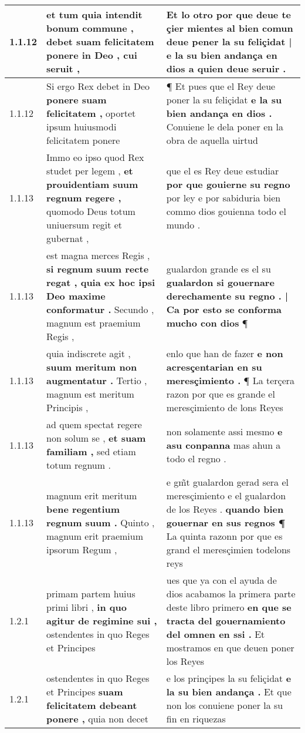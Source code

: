 \begin{tabular}{|p{1cm}|p{6.5cm}|p{6.5cm}|}
1.1.12 & et tum quia intendit bonum commune , \textbf{ debet suam felicitatem ponere in Deo , } cui seruit , & Et lo otro por que deue te çier mientes al bien comun \textbf{ deue pener la su feliçidat | e la su bien andança en dios } a quien deue seruir . \\\hline
1.1.12 & Si ergo Rex debet in Deo \textbf{ ponere suam felicitatem , } oportet ipsum huiusmodi felicitatem ponere & ¶ Et pues que el Rey deue poner la su feliçidat \textbf{ e la su bien andança en dios . } Conuiene le dela poner en la obra de aquella uirtud \\\hline
1.1.13 & Immo eo ipso quod Rex studet per legem , \textbf{ et prouidentiam suum regnum regere , } quomodo Deus totum uniuersum regit et gubernat , & que el es Rey deue estudiar \textbf{ por que gouierne su regno } por ley e por sabiduria bien commo dios gouienna todo el mundo . \\\hline
1.1.13 & est magna merces Regis , \textbf{ si regnum suum recte regat , quia ex hoc ipsi Deo maxime conformatur . } Secundo , magnum est praemium Regis , & gualardon grande es el su \textbf{ gualardon si gouernare derechamente su regno . | Ca por esto se conforma mucho con dios } ¶ \\\hline
1.1.13 & quia indiscrete agit , \textbf{ suum meritum non augmentatur . } Tertio , magnum est meritum Principis , & enlo que han de fazer \textbf{ e non acresçentarian en su meresçimiento . } ¶ La terçera razon por que es grande el meresçimiento de lons Reyes \\\hline
1.1.13 & ad quem spectat regere non solum se , \textbf{ et suam familiam , } sed etiam totum regnum . & non solamente assi mesmo \textbf{ e asu conpanna } mas ahun a todo el regno . \\\hline
1.1.13 & magnum erit meritum \textbf{ bene regentium regnum suum . } Quinto , magnum erit praemium ipsorum Regum , & e gm̃t gualardon gerad sera el meresçimiento e el gualardon de los Reyes . \textbf{ quando bien gouernar en sus regnos ¶ } La quinta razonn por que es grand el meresçimien todelons reys \\\hline
1.2.1 & primam partem huius primi libri , \textbf{ in quo agitur de regimine sui , } ostendentes in quo Reges et Principes & ues que ya con el ayuda de dios acabamos la primera parte deste libro primero \textbf{ en que se tracta del gouernamiento del omnen en ssi . } Et mostramos en que deuen poner los Reyes \\\hline
1.2.1 & ostendentes in quo Reges et Principes \textbf{ suam felicitatem debeant ponere , } quia non decet & e los prinçipes la su feliçidat \textbf{ e la su bien andança . } Et que non los conuiene poner la su fin en riquezas \\\hline

\end{tabular}

